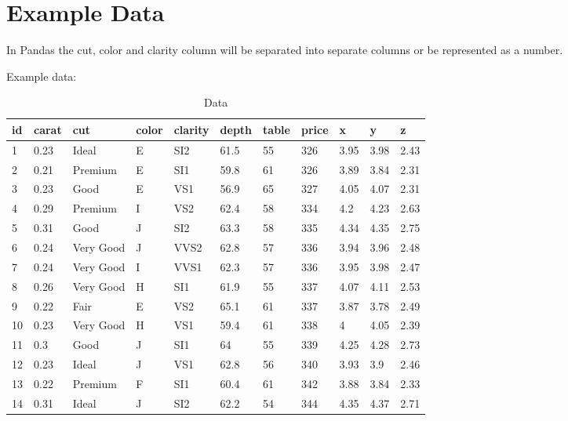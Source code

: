 \documentclass{scrreprt}
\begin{document}
	\chapter{Example Data}
		In Pandas the cut, color and clarity column will be separated into separate columns or be represented as a number.\par
		Example data:
		\begin{table}[ht]
			\centering
			\caption{Data}
			\label{table-data}
			\begin{tabular}{|l|l|l|l|l|l|l|l|l|l|l|}
				\hline id & carat & cut       & color & clarity & depth & table & price & x    & y    & z    \\ \hline
				1  & 0.23  & Ideal     & E     & SI2     & 61.5  & 55    & 326   & 3.95 & 3.98 & 2.43 \\ \hline
				2  & 0.21  & Premium   & E     & SI1     & 59.8  & 61    & 326   & 3.89 & 3.84 & 2.31 \\ \hline
				3  & 0.23  & Good      & E     & VS1     & 56.9  & 65    & 327   & 4.05 & 4.07 & 2.31 \\ \hline
				4  & 0.29  & Premium   & I     & VS2     & 62.4  & 58    & 334   & 4.2  & 4.23 & 2.63 \\ \hline
				5  & 0.31  & Good      & J     & SI2     & 63.3  & 58    & 335   & 4.34 & 4.35 & 2.75 \\ \hline
				6  & 0.24  & Very Good & J     & VVS2    & 62.8  & 57    & 336   & 3.94 & 3.96 & 2.48 \\ \hline
				7  & 0.24  & Very Good & I     & VVS1    & 62.3  & 57    & 336   & 3.95 & 3.98 & 2.47 \\ \hline
				8  & 0.26  & Very Good & H     & SI1     & 61.9  & 55    & 337   & 4.07 & 4.11 & 2.53 \\ \hline
				9  & 0.22  & Fair      & E     & VS2     & 65.1  & 61    & 337   & 3.87 & 3.78 & 2.49 \\ \hline
				10 & 0.23  & Very Good & H     & VS1     & 59.4  & 61    & 338   & 4    & 4.05 & 2.39 \\ \hline
				11 & 0.3   & Good      & J     & SI1     & 64    & 55    & 339   & 4.25 & 4.28 & 2.73 \\ \hline
				12 & 0.23  & Ideal     & J     & VS1     & 62.8  & 56    & 340   & 3.93 & 3.9  & 2.46 \\ \hline
				13 & 0.22  & Premium   & F     & SI1     & 60.4  & 61    & 342   & 3.88 & 3.84 & 2.33 \\ \hline
				14 & 0.31  & Ideal     & J     & SI2     & 62.2  & 54    & 344   & 4.35 & 4.37 & 2.71 \\ \hline
			\end{tabular}			
		\end{table}
	
\end{document}
